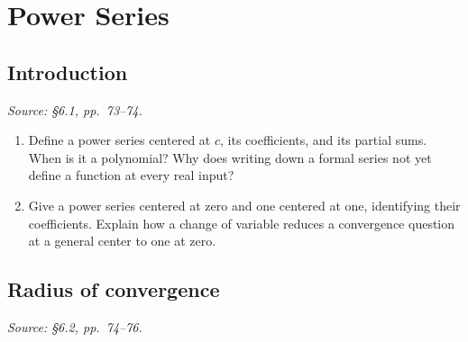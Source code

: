 
\section{Power Series}

\subsection{Introduction}
\textit{Source: \S6.1, pp.~73--74.}

\begin{enumerate}
  \item Define a power series centered at \(c\), its coefficients,
    and its partial sums. When is it a polynomial?
    Why does writing down a formal series not yet define a function
    at every real input?

  \item Give a power series centered at zero and one centered at one,
    identifying their coefficients. Explain how a change of variable
    reduces a convergence question at a general center to one at zero.
\end{enumerate}

\subsection{Radius of convergence}
\textit{Source: \S6.2, pp.~74--76.}

